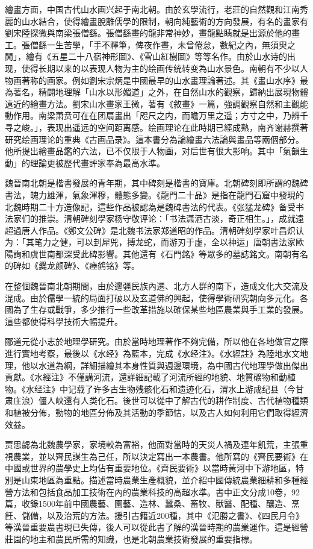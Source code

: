 繪畫方面，中国古代山水画兴起于南北朝。由於玄學流行，老莊的自然觀和江南秀麗的山水結合，使得繪畫脫離儒學的限制，朝向純藝術的方向發展，有名的畫家有劉宋陸探微與南梁張僧繇。張僧繇畫的龍非常神妙，畫龍點睛就是出源於他的畫工。張僧繇一生苦學，「手不釋筆，俾夜作晝，未曾倦怠，數紀之內，無須臾之閒」，繪有《五星二十八宿神形圖》、《雪山紅樹圖》等等名作。由於山水诗的出现，使得长期以来的以表现人物为主的绘画传统转变為山水景色。南朝有不少以人物画著称的画家。例如劉宋宗炳是中國最早的山水畫理論著述。其《畫山水序》最為著名，精闢地理解「山水以形媚道」之外，在自然山水的觀察，歸納出展現物體遠近的繪畫方法。劉宋山水畫家王微，著有《敘畫》一篇，強調觀察自然和主觀能動作用。南梁萧贲可在在团扇畫出「咫尺之内，而瞻万里之遥；方寸之中，乃辨千寻之峻。」，表现出遥远的空间距离感。绘画理论在此時期已經成熟，南齐谢赫撰著研究绘画理论的重典《古画品录》。這本書分為論繪畫六法論與畫品等兩個部分。他所提出繪畫品鑑的六法，已不仅限于人物画，对后世有很大影响。其中「氣韻生動」的理論更被歷代畫評家奉為最高水準。

魏晉南北朝是楷書發展的青年期，其中碑刻是楷書的寶庫。北朝碑刻即所謂的魏碑書法，魄力雄渾，氣象渾穆，體態多變。《龍門二十品》是指在龍門石窟中發現的北魏時期二十方造像記，這些作品被認為是魏碑書法的代表。《张猛龙碑》备受书法家们的推崇。清朝碑刻學家杨守敬评论：「书法潇洒古淡，奇正相生。」，成就遠超過唐人作品。《鄭文公碑》是北魏书法家郑道昭的作品。清朝碑刻學家叶昌炽认为：「其笔力之健，可以刲犀兕，搏龙蛇，而游刃于虚，全以神运」唐朝書法家歐陽詢和虞世南都深受此碑影響。其他還有《石門銘》等眾多的墓誌銘文。南朝有名的碑如《爨龙颜碑》、《瘗鹤铭》等。

在整個魏晉南北朝期間，由於邊疆民族內遷、北方人群的南下，造成文化大交流及混成。由於儒學一統的局面打破以及玄道佛的興起，使得學術研究朝向多元化。各國為了生存或戰爭，多少推行一些改革措施以確保某些地區農業與手工業的發展。這些都使得科學技術大幅提升。

郦道元從小志於地理學研究。由於當時地理著作不夠完備，所以他在各地做官之際進行實地考察，最後以《水经》為藍本，完成《水经注》。《水經註》為陸地水文地理，他以水道為綱，詳細描繪其本身性質與週邊環境，為中國古代地理學做出傑出貢獻。《水經注》不僅講河流，還詳細記載了河流所經的地貌、地質礦物和動植物。《水经注》中记载了许多古生物残骸化石和遗迹化石，渭水上游成纪县（今甘肃庄浪）僵人峡還有人类化石。後世可以從中了解古代的耕作制度、古代植物種類和植被分佈，動物的地區分佈及其活動的季節怙，以及古人如何利用它們取得經濟效益。

贾思勰為北魏農學家，家境較為富裕，他面對當時的天災人禍及連年飢荒，主張重視農業，並以齊民謀生為己任，所以決定寫出一本農書。他所寫的《齊民要術》在中國或世界的農學史上均佔有重要地位。《齊民要術》以當時黃河中下游地區，特別是山東地區為重點。描述當時農業生產概貌，並介紹中國傳統農業細耕和多種經營方法和包括食品加工技術在內的農業科技的高超水準。書中正文分成10卷，92篇，收錄1500年前中國農藝、園藝、造林、蠶桑、畜牧、獸醫、配種、釀造、烹飪、儲備，以及治荒的方法。援引古籍近200種，其中《氾勝之書》、《四民月令》等漢晉重要農書現已失傳，後人可以從此書了解的漢晉時期的農業運作。這是經營莊園的地主和農民所需的知識，也是北朝農業技術發展的重要指標。

